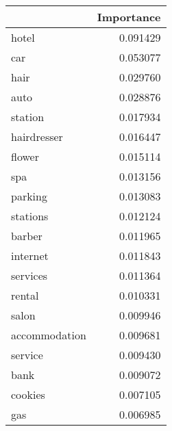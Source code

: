 \begin{tabular}{lr}
\toprule
{} &  Importance \\
\midrule
hotel         &    0.091429 \\
car           &    0.053077 \\
hair          &    0.029760 \\
auto          &    0.028876 \\
station       &    0.017934 \\
hairdresser   &    0.016447 \\
flower        &    0.015114 \\
spa           &    0.013156 \\
parking       &    0.013083 \\
stations      &    0.012124 \\
barber        &    0.011965 \\
internet      &    0.011843 \\
services      &    0.011364 \\
rental        &    0.010331 \\
salon         &    0.009946 \\
accommodation &    0.009681 \\
service       &    0.009430 \\
bank          &    0.009072 \\
cookies       &    0.007105 \\
gas           &    0.006985 \\
\bottomrule
\end{tabular}
